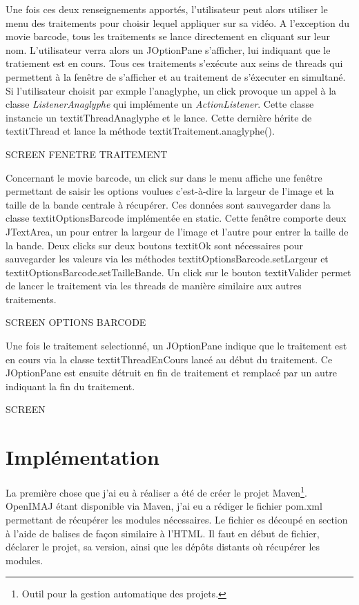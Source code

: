 \documentclass[10pt,a4paper]{article}
\begin{document}
Une fois ces deux renseignements apportés, l'utilisateur peut alors utiliser le menu des traitements pour choisir lequel appliquer sur sa vidéo. A l'exception du movie barcode, tous les traitements se lance directement en cliquant sur leur nom. L'utilisateur verra alors un JOptionPane s'afficher, lui indiquant que le tratiement est en cours. Tous ces traitements s'exécute aux seins de threads qui permettent à la fenêtre de s'afficher et au traitement de s'éxecuter en simultané. Si l'utilisateur choisit par exmple l'anaglyphe, un click provoque un appel à la classe \textit{ListenerAnaglyphe} qui implémente un \textit{ActionListener}. Cette classe instancie un textit{ThreadAnaglyphe} et le lance. Cette dernière hérite de textit{Thread} et lance la méthode textit{Traitement.anaglyphe()}. 

SCREEN FENETRE TRAITEMENT

Concernant le movie barcode, un click sur dans le menu affiche une fenêtre permettant de saisir les options voulues c'est-à-dire la largeur de l'image et la taille de la bande centrale à récupérer. Ces données sont sauvegarder dans la classe textit{OptionsBarcode} implémentée en static. Cette fenêtre comporte deux JTextArea, un pour entrer la largeur de l'image et l'autre pour entrer la taille de la bande. Deux clicks sur deux boutons textit{Ok} sont nécessaires pour sauvegarder les valeurs via les méthodes textit{OptionsBarcode.setLargeur} et textit{OptionsBarcode.setTailleBande}. Un click sur le bouton textit{Valider} permet de lancer le traitement via les threads de manière similaire aux autres traitements.

SCREEN OPTIONS BARCODE

Une fois le traitement selectionné, un JOptionPane indique que le traitement est en cours via la classe textit{ThreadEnCours} lancé au début du traitement. Ce JOptionPane est ensuite détruit en fin de traitement et remplacé par un autre indiquant la fin du traitement.

SCREEN



\section{Implémentation}

La première chose que j'ai eu à réaliser a été de créer le projet Maven\footnote{Outil pour la gestion automatique des projets.}. OpenIMAJ étant disponible via Maven,
j'ai eu a rédiger le fichier pom.xml permettant de récupérer les modules nécessaires. Le fichier es découpé en section à l'aide de balises de façon similaire à l'HTML. Il faut en début de fichier,
déclarer le projet, sa version, ainsi que les dépôts distants où récupérer les modules. \newpage
\end{document}

